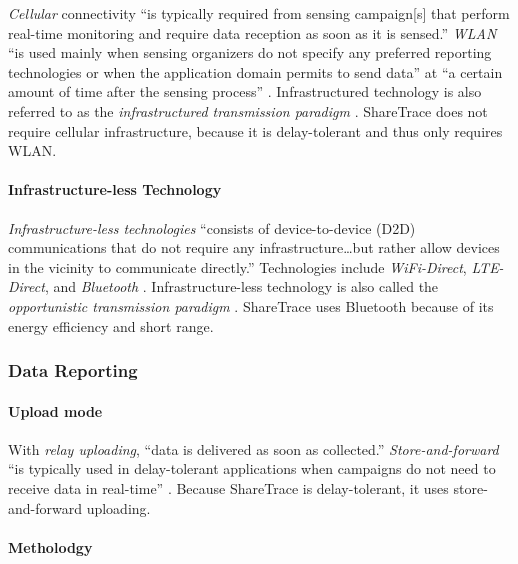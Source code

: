\emph{Cellular} connectivity ``is typically required from sensing campaign[s] that perform real-time monitoring and require data reception as soon as it is sensed.'' \emph{WLAN} ``is used mainly when sensing organizers do not specify any preferred reporting technologies or when the application domain permits to send data'' at ``a certain amount of time after the sensing process'' \cite{Capponi2019}. Infrastructured technology is also referred to as the \emph{infrastructured transmission paradigm} \cite{Ma2014}. ShareTrace does not require cellular infrastructure, because it is delay-tolerant and thus only requires WLAN.

\paragraph{Infrastructure-less Technology}

\emph{Infrastructure-less technologies} ``consists of device-to-device (D2D) communications that do not require any infrastructure{\ldots}but rather allow devices in the vicinity to communicate directly.'' Technologies include \emph{WiFi-Direct}, \emph{LTE-Direct}, and \emph{Bluetooth} \cite{Capponi2019}. Infrastructure-less technology is also called the \emph{opportunistic transmission paradigm} \cite{Ma2014}. ShareTrace uses Bluetooth because of its energy efficiency and short range.

\subsubsection{Data Reporting}

\paragraph{Upload mode}

With \emph{relay uploading}, ``data is delivered as soon as collected.'' \emph{Store-and-forward} ``is typically used in delay-tolerant applications when campaigns do not need to receive data in real-time'' \cite{Capponi2019}. Because ShareTrace is delay-tolerant, it uses store-and-forward uploading.

\paragraph{Metholodgy}

